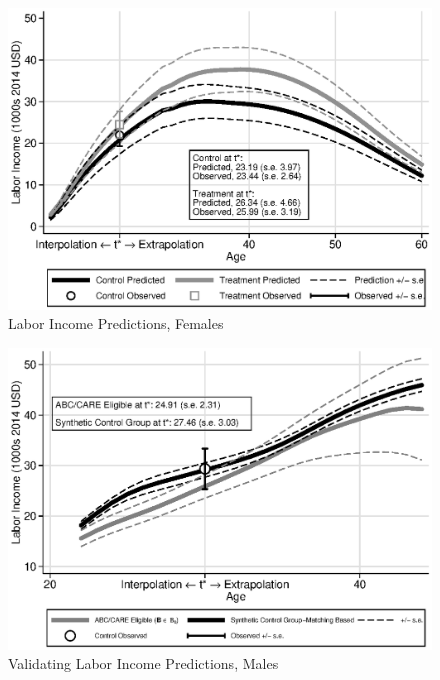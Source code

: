 \begin{frame}[plain]
	\begin{center}
\begin{figure}[H] 
\caption{Labor Income Predictions, Females}
\label{figure:youlabel}
\centering
\includegraphics[width=.9\columnwidth]{output/labor_25-65_pset1_mset3_female.eps}
\end{figure}
\end{center}
\end{frame}

\begin{frame}[plain]
	\begin{center}
\begin{figure}[H] 
\caption{Validating Labor Income Predictions, Males}
\label{figure:youlabel}
\centering
\includegraphics[width=.9\columnwidth]{output/abccare_disad_1.eps}
\end{figure}
\end{center}
\end{frame}

